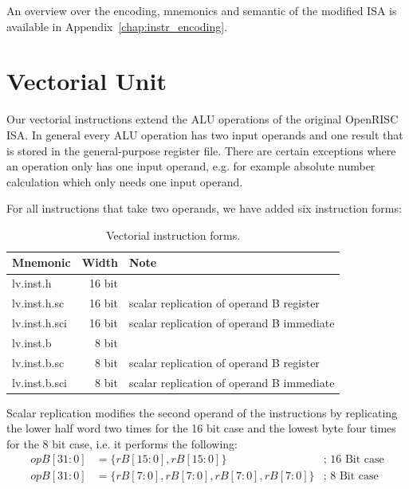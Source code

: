 An overview over the encoding, mnemonics and semantic of the modified \gls{ISA}
is available in Appendix~\ref{chap:instr_encoding}.

\section{Vectorial Unit}
\label{sec:vectorial}

Our vectorial instructions extend the \gls{ALU} operations of the original
OpenRISC \gls{ISA}. In general every \gls{ALU} operation has two input operands
and one result that is stored in the general-purpose register file. There are
certain exceptions where an operation only has one input operand, e.g. for
example absolute number calculation which only needs one input operand.

\clearpage
For all instructions that take two operands, we have added six instruction
forms:

\begin{table}[H]
 \caption{Vectorial instruction forms.}
 \label{tab:vectorial_instr_forms}
 \centering\begin{tabular}{@{}lrl@{}} \toprule
  \textbf{Mnemonic} & \textbf{Width} & \textbf{Note} \\ \midrule
  lv.inst.h         & 16 bit         &  \\
  lv.inst.h.sc      & 16 bit         & scalar replication of operand B register \\
  lv.inst.h.sci     & 16 bit         & scalar replication of operand B immediate  \\
  lv.inst.b         &  8 bit         &  \\
  lv.inst.b.sc      &  8 bit         & scalar replication of operand B register \\
  lv.inst.b.sci     &  8 bit         & scalar replication of operand B immediate \\
  \bottomrule
 \end{tabular}
\end{table}

Scalar replication modifies the second operand of the instructions by
replicating the lower half word two times for the 16 bit case and the lowest
byte four times for the 8 bit case, i.e. it performs the following:
\begin{align*}
  opB[31:0] &= \{rB[15:0], rB[15:0]\} &\text{; 16 Bit case}\\
  opB[31:0] &= \{rB[7:0], rB[7:0], rB[7:0], rB[7:0]\} & \text{; 8 Bit case}\\
\end{align*}


